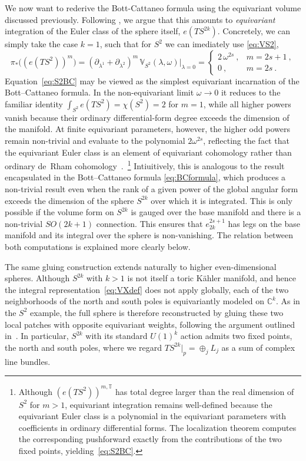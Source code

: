 \documentclass[11pt,a4paper]{article}
\theoremstyle{definition}
\theoremstyle{identity}
\theoremstyle{remark}
\newcommand{\be}{\begin{equation}}
\newcommand{\ee}{\end{equation}}
\newcommand{\BV}{\mathbb{V}}
\newcommand{\BT}{\mathbb{T}}
\newcommand{\BC}{\mathbb{C}}
\begin{document}
We now want to rederive the Bott-Cattaneo formula using the equivariant volume discussed previously. Following \cite{Hosseini:2020vgl}, we argue that this amounts to \emph{equivariant} integration of the Euler class of the sphere itself, $e(TS^{2k})$. Concretely, we can simply take the case $k=1$, such that for $S^2$ we can imediately use \eqref{eq:VS2},
\be
\pi_*
\Big((e(TS^2))^m\Big)
=
(\partial_{\lambda^1}+\partial_{\lambda^2})^m\,
\BV_{S^2}(\lambda,\omega)
\Big|_{\lambda=0}
=
\begin{cases}
2\,\omega^{2s}\ ,
&
m=2s+1\ ,
\\[2mm]
0\ ,
&
m=2s\ .
\end{cases}
\label{eq:S2BC}
\ee
Equation~\eqref{eq:S2BC} may be viewed as the simplest equivariant incarnation of the
Bott--Cattaneo formula. In the non-equivariant limit $\omega\rightarrow0$ it reduces to the familiar
identity $ \int_{S^2}e(TS^2)=\chi(S^2)=2$ for $m=1$, while all higher powers vanish because their ordinary differential-form degree exceeds
the dimension of the manifold. At finite equivariant parameters, however, the higher odd powers
remain non-trivial and evaluate to the polynomial $2\omega^{2s}$, reflecting the fact that the
equivariant Euler class is an element of equivariant cohomology rather than ordinary de~Rham
cohomology~\cite{Hosseini:2020vgl}.~\footnote{Although $(e(TS^2))^{m,\BT}$ has total degree larger than the real dimension of $S^2$
for $m>1$, equivariant integration remains well-defined because the equivariant Euler class is a
polynomial in the equivariant parameters with coefficients in ordinary differential forms. The
localization theorem computes the corresponding pushforward exactly from the contributions of the
two fixed points, yielding~\eqref{eq:S2BC}.} Intiuitively, this is analogous to the result encapsulated in the Bott--Cattaneo formula \eqref{eq:BCformula}, which produces a non-trivial result even when the rank of a given power of the global angular form exceeds the dimension of the sphere $S^{2k}$ over which it is integrated. This is only possible if the volume form on $S^{2k}$ is gauged over the base manifold and there is a non-trivial $SO(2k+1)$ connection. This ensures that $e_{2k}^{2s+1}$ has legs on the base manifold and its integral over the sphere is non-vanishing. The relation between both computations is explained more clearly below.

The same gluing construction extends naturally to higher even-dimensional spheres. Although
$S^{2k}$ with $k>1$ is not itself a toric K\"ahler manifold, and hence the integral
representation~\eqref{eq:VXdef} does not apply globally, each of the two neighborhoods of the
north and south poles is equivariantly modeled on $\BC^k$. As in the $S^2$ example, the full
sphere is therefore reconstructed by gluing these two local patches with opposite equivariant
weights, following the argument outlined in~\cite[Section~3.1.2]{Hosseini:2020vgl}. In particular, $S^{2k}$ with its standard $U(1)^k$ action admits two fixed points, the north and south poles, where we regard $TS^{2k}|_p=\oplus_jL_j$ as a sum of complex line bundles.
\end{document}
